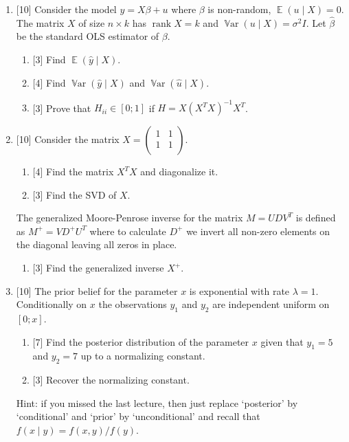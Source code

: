 \documentclass[12pt]{article}
\DeclareMathOperator{\Var}{\mathbb{V}ar}
\DeclareMathOperator{\rank}{rank}
\DeclareMathOperator{\E}{\mathbb{E}}
\newcommand{\hb}{\hat{\beta}}
\begin{document}
\begin{enumerate}
    \item {[10]} Consider the model $y = X\beta + u$ where $\beta$ is non-random, $\E(u \mid X ) = 0$. 
    The matrix $X$ of size $n\times k$ has $\rank X = k$ and $\Var(u \mid X) = \sigma^2 I$.
    Let $\hb$ be the standard OLS estimator of $\beta$.

    \begin{enumerate}
        \item {[3]} Find $\E(\hat y \mid X)$.
        \item {[4]} Find $\Var(\hat y \mid X)$ and $\Var(\hat u \mid X)$.
        \item {[3]} Prove that $H_{ii} \in [0;1]$ if $H = X(X^TX)^{-1}X^T$.
    \end{enumerate}

    \item {[10]} Consider the matrix $X = \begin{pmatrix}
        1 & 1 \\
        1 & 1 \\
    \end{pmatrix}$.
    
    \begin{enumerate}
        \item {[4]} Find the matrix $X^TX$ and diagonalize it. 
        \item {[3]} Find the SVD of $X$. 
    \end{enumerate}
    
    The generalized Moore-Penrose inverse for the matrix $M = U D V^T$ is defined as
    $M^+ = V D^+ U^T$ where to calculate $D^+$ we invert all non-zero elements on the diagonal leaving all zeros in place. 
    \begin{enumerate}[resume]
        \item {[3]} Find the generalized inverse $X^+$.
    \end{enumerate}


    \item {[10]} The prior belief for the parameter $x$ is exponential with rate $\lambda = 1$. 
    Conditionally on $x$ the observations $y_1$ and $y_2$ are independent uniform on $[0;x]$.

    \begin{enumerate}
        \item {[7]} Find the posterior distribution of the parameter $x$ given that $y_1 = 5$ and $y_2 = 7$ up to a normalizing constant.
        \item {[3]} Recover the normalizing constant. 
    \end{enumerate}

    Hint: if you missed the last lecture, 
    then just replace `posterior' by `conditional' and `prior' by `unconditional' and recall that $f(x \mid y) = f(x, y) / f(y)$.

 
    
    

    



\end{enumerate}
\end{document}
